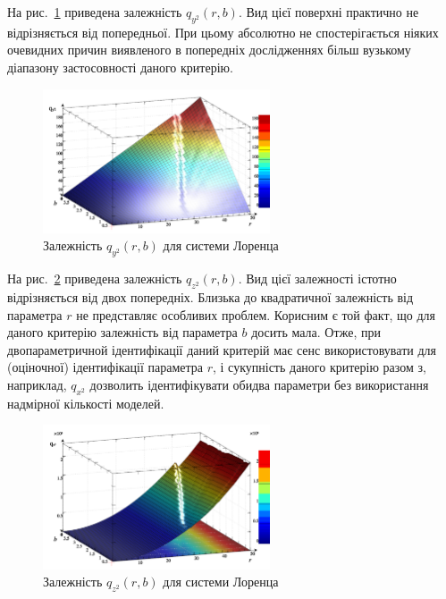 На рис.~\ref{atu:f:lor_qy2_r_b} приведена залежність
$q_{y^2} (r, b) $. Вид цієї поверхні практично не відрізняється від
попередньої. При цьому абсолютно не спостерігається ніяких
очевидних причин виявленого в попередніх дослідженнях більш
вузькому діапазону застосовності даного критерію.

\begin{figure}[htb!]
  \begin{center}
    \includegraphics[width=0.60\textwidth]{p/cha/lor/q2d/lor_qy2_r_b.png}
  \end{center}
  \caption{Залежність $ q_{y^2} (r, b) $ для системи Лоренца}
  \label{atu:f:lor_qy2_r_b}
\end{figure}

На рис.~\ref{atu:f:lor_qz2_r_b} приведена залежність
$q_{z^2}(r,b)$.
Вид цієї залежності істотно відрізняється від двох попередніх.
Близька до квадратичної залежність від параметра $r$ не представляє особливих
проблем. Корисним є той факт, що для даного критерію залежність від параметра $b$
досить мала. Отже, при двопараметричной ідентифікації даний критерій має
сенс використовувати для (оціночної) ідентифікації параметра $r$, і
сукупність даного критерію разом з, наприклад, $q_{x^2}$ дозволить
ідентифікувати обидва параметри без використання надмірної кількості моделей.

\begin{figure}[htb!]
  \begin{center}
    \includegraphics[width=0.60\textwidth]{p/cha/lor/q2d/lor_qz2_r_b.png}
  \end{center}
  \caption{Залежність $ q_{z^2} (r, b) $ для системи Лоренца}
  \label{atu:f:lor_qz2_r_b}
\end{figure}


